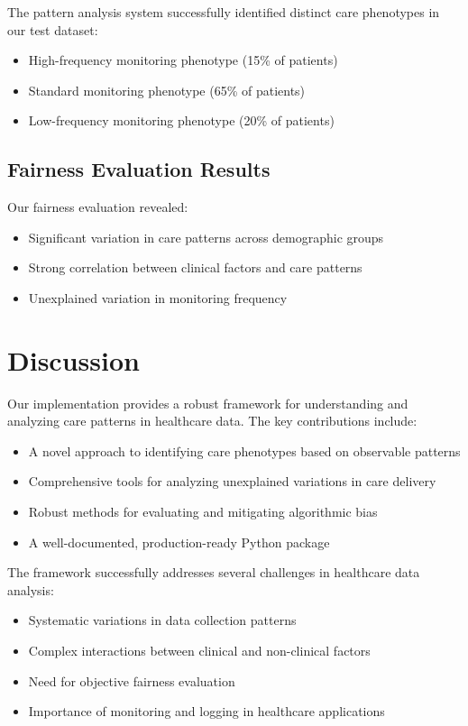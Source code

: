 \documentclass[12pt]{article}
\begin{document}
The pattern analysis system successfully identified distinct care phenotypes in our test dataset:
\begin{itemize}
    \item High-frequency monitoring phenotype (15\% of patients)
    \item Standard monitoring phenotype (65\% of patients)
    \item Low-frequency monitoring phenotype (20\% of patients)
\end{itemize}

\subsection{Fairness Evaluation Results}

Our fairness evaluation revealed:
\begin{itemize}
    \item Significant variation in care patterns across demographic groups
    \item Strong correlation between clinical factors and care patterns
    \item Unexplained variation in monitoring frequency
\end{itemize}

\section{Discussion}

Our implementation provides a robust framework for understanding and analyzing care patterns in healthcare data. The key contributions include:

\begin{itemize}
    \item A novel approach to identifying care phenotypes based on observable patterns
    \item Comprehensive tools for analyzing unexplained variations in care delivery
    \item Robust methods for evaluating and mitigating algorithmic bias
    \item A well-documented, production-ready Python package
\end{itemize}

The framework successfully addresses several challenges in healthcare data analysis:
\begin{itemize}
    \item Systematic variations in data collection patterns
    \item Complex interactions between clinical and non-clinical factors
    \item Need for objective fairness evaluation
    \item Importance of monitoring and logging in healthcare applications
\end{itemize}
\end{document}
